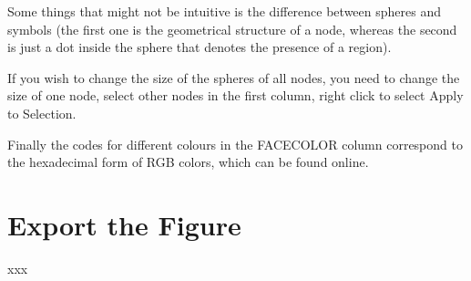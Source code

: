 \documentclass{tufte-handout}
\begin{document}
Some things that might not be intuitive is the difference between spheres and symbols (the first one is the geometrical structure of a node, whereas the second is just a dot inside the sphere that denotes the presence of a region). 


If you wish to change the size of the spheres of all nodes, you need to change the size of one node, select other nodes in the first column, right click to select Apply to Selection.


Finally the codes for different colours in the FACECOLOR column correspond to the hexadecimal form of RGB colors, which can be found online.

\clearpage
\section{Export the Figure}

xxx
\end{document}
